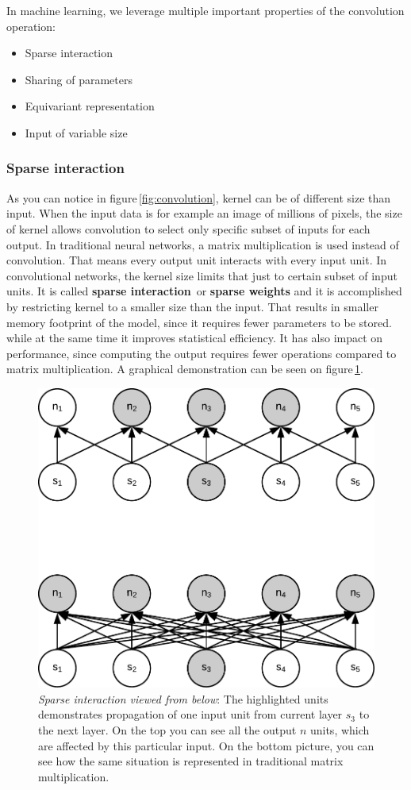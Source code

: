 In machine learning, we leverage multiple important properties of the convolution operation:

\begin{itemize}
    \item Sparse interaction
    \item Sharing of parameters
    \item Equivariant representation
    \item Input of variable size
\end{itemize}

\subsubsection{Sparse interaction}

As you can notice in figure\,\ref{fig:convolution}, kernel can be of different size than input. When the input data is for example an image of millions of pixels, the size of kernel allows convolution to select only specific subset of inputs for each output. In traditional neural networks, a matrix multiplication is used instead of convolution. That means every output unit interacts with every input unit. In convolutional networks, the kernel size limits that just to certain subset of input units. It is called \textbf{sparse interaction}\,\cite[p.~335]{deeplearningbook} or \textbf{sparse weights} and it is accomplished by restricting kernel to a smaller size than the input. That results in smaller memory footprint of the model, since it requires fewer parameters to be stored. while at the same time it improves statistical efficiency. It has also impact on performance, since computing the output requires fewer operations compared to matrix multiplication. A graphical demonstration can be seen on figure\,\ref{fig:sparse_b}.

\begin{figure}[ht]
    \centering
    \includegraphics[width=.6\textwidth]{obrazky-figures/sparse_b.pdf}
    \caption{\textit{Sparse interaction viewed from below}: The highlighted units demonstrates propagation of one input unit from current layer $s_3$ to the next layer. On the top you can see all the output $n$ units, which are affected by this particular input. On the bottom picture, you can see how the same situation is represented in traditional matrix multiplication.}\label{fig:sparse_b}
\end{figure}

